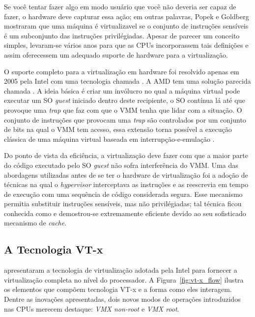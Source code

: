 Se você tentar fazer algo em modo usuário que você não deveria ser capaz de
fazer, o hardware deve capturar essa ação; em outras palavras, Popek e Goldberg
mostraram que uma máquina é virtualizavel se o conjunto de instruções sensíveis
é um subconjunto das instruções privilégiadas. Apesar de parecer um conceito
simples, levaram-se vários anos para que as CPUs incorporassem tais definições
e assim oferecessem um adequado suporte de hardware para a virtualização.

O suporte completo para a virtualização em hardware foi resolvido apenas em
2005 pela Intel \citep{uhlig} com uma tecnologia chamada
. A AMD tem uma solução parecida
chamada . A ideia básica é criar um
invólucro no qual a máquina virtual pode executar um SO \emph{guest} iniciado
dentro deste recipiente, o SO contínua lá até que provoque uma \emph{trap} que
faz com que o VMM tenha que lidar com a situação. O conjunto de instruções que
provocam uma \emph{trap} são controlados por um conjunto de bits na qual o VMM
tem acesso, essa extensão torna possível a execução clássica de uma máquina
virtual baseada em interrupção-e-emulação \citep{tanenbaum}.

Do ponto de vista da eficiência, a virtualização deve fazer com que a maior
parte do código executado pelo SO \emph{guest} não sofra interferência do VMM.
Uma das abordagens utilizadas antes de se ter o hardware de virtualização foi a
adoção de técnicas na qual o \textit{hypervisor} interceptava as instruções e
as reescrevia em tempo de execução com uma sequência de código considerada
segura. Esse mecanismo permitia substituir instruções sensíveis, mas não
privilégiadas; tal técnica ficou conhecida como 
e demostrou-se extremamente eficiente devido ao seu sofisticado mecanismo de
\emph{cache}.


\subsection{A Tecnologia VT-x}
\label{sec:vtx}

\cite{uhlig} apresentaram a tecnologia de virtualização adotada pela Intel para
fornecer a virtualização completa no nível do processador. A
Figura~\ref{fig:vt-x_flow} ilustra os elementos que compõem tecnologia VT-x e a
forma como eles interagem. Dentre as inovações apresentadas, dois novos modos
de operações introduzidos nas CPUs merecem destaque: \emph{VMX non-root} e
	\emph{VMX root}.

